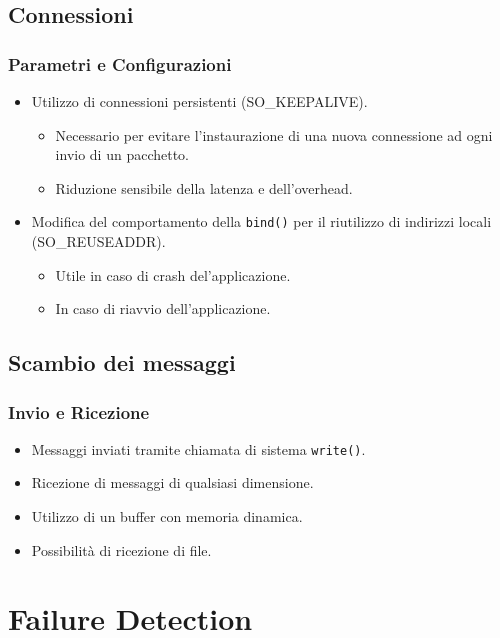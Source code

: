 \documentclass[a4paper,italian,12pt]{beamer}
\begin{document}
		\subsection{Connessioni}
			\begin{frame}
				\frametitle{Parametri e Configurazioni}
				\begin{itemize}
					\item Utilizzo di connessioni persistenti (SO\_KEEPALIVE).
						\begin{itemize}
							\vspace{2mm}
							\item Necessario per evitare l'instaurazione di una nuova connessione ad ogni invio di un pacchetto.
							\item Riduzione sensibile della latenza e dell'overhead.							 
						\end{itemize}
					\vspace{5mm}	
					\item Modifica del comportamento della \texttt{bind()} per il riutilizzo di indirizzi locali (SO\_REUSEADDR).
						\begin{itemize}
							\vspace{2mm}
							\item Utile in caso di crash del'applicazione.
							\item In caso di riavvio dell'applicazione.
						\end{itemize}
				\end{itemize}
			\end{frame}	
		\subsection{Scambio dei messaggi}
			\begin{frame}
				\frametitle{Invio e Ricezione}
					\begin{itemize}
						\item Messaggi inviati tramite chiamata di sistema \texttt{write()}.
						\vspace{5mm}
						\item Ricezione di messaggi di qualsiasi dimensione. 
						\item Utilizzo di un buffer con memoria dinamica.
						\item Possibilità di ricezione di file.
					\end{itemize}	
			\end{frame}
	\section{Failure Detection}
\end{document}
